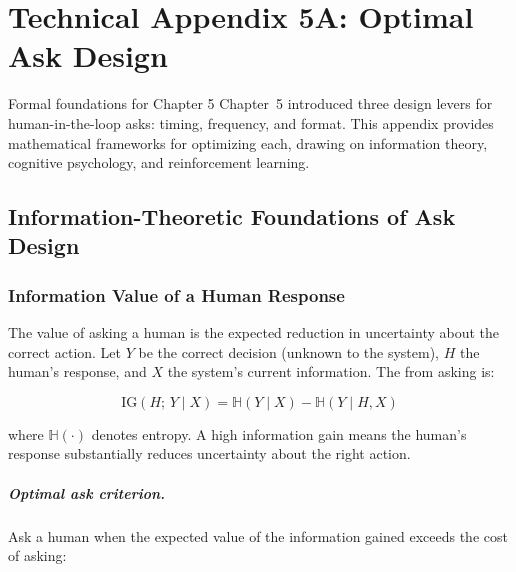 
\chapter*{Technical Appendix 5A: Optimal Ask Design}

\begin{chapterquote}{Formal foundations for Chapter 5}
Chapter~5 introduced three design levers for human-in-the-loop asks: timing, frequency, and format. This appendix provides mathematical frameworks for optimizing each, drawing on information theory, cognitive psychology, and reinforcement learning.
\end{chapterquote}

\apxnumon
\section{Information-Theoretic Foundations of Ask Design}

\subsection{Information Value of a Human Response}

The value of asking a human is the expected reduction in uncertainty about the correct action. Let $Y$ be the correct decision (unknown to the system), $H$ the human's response, and $X$ the system's current information. The  from asking is:

\[
\text{IG}(H;\, Y \mid X) = \mathbb{H}(Y \mid X) - \mathbb{H}(Y \mid H, X)
\]

where $\mathbb{H}(\cdot)$ denotes entropy. A high information gain means the human's response substantially reduces uncertainty about the right action.

\paragraph{Optimal ask criterion.} Ask a human when the expected value of the information gained exceeds the cost of asking:


